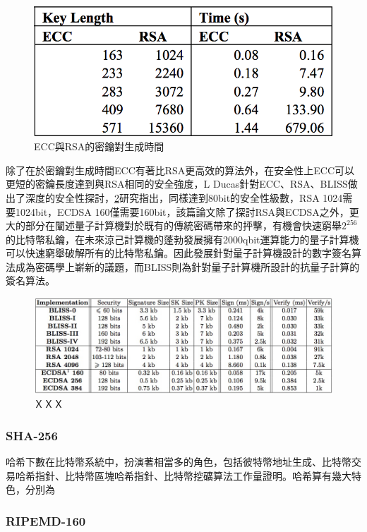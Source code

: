 			\begin{figure}[h]
				\centering
				\includegraphics[width = .5\textwidth]{ECCtime.png}
				\caption{ECC與RSA的密鑰對生成時間\parencite{Performancecomparisonofellipticcurveandrsadigitalsignatures}}\label{ECCtime}
			\end{figure}

			除了在於密鑰對生成時間ECC有著比RSA更高效的算法外，在安全性上ECC可以更短的密鑰長度達到與RSA相同的安全強度，L Ducas針對ECC、RSA、BLISS做出了深度的安全性探討\parencite{LatticesignaturesandbimodalGaussians}，\ref{LatticesignaturesandbimodalGaussians}研究指出，同樣達到80bit的安全性級數，RSA 1024需要1024bit，ECDSA 160僅需要160bit，該篇論文除了探討RSA與ECDSA之外，更大的部分在闡述量子計算機對於既有的傳統密碼帶來的抨擊，有機會快速窮舉$2^{256}$的比特幣私鑰，在未來涼己計算機的蓬勃發展擁有2000qbit運算能力的量子計算機可以快速窮舉破解所有的比特幣私鑰。因此發展針對量子計算機設計的數字簽名算法成為密碼學上嶄新的議題，而BLISS則為針對量子計算機所設計的抗量子計算的簽名算法。

			\begin{figure}[h]
				\centering
				\includegraphics[width = 1\textwidth]{LatticesignaturesandbimodalGaussians.png}
				\caption{ＸＸＸ\parencite{LatticesignaturesandbimodalGaussians}}\label{LatticesignaturesandbimodalGaussians}
			\end{figure}

			\subsubsection{SHA-256}
			哈希下數在比特幣系統中，扮演著相當多的角色，包括彼特幣地址生成、比特幣交易哈希指針、比特幣區塊哈希指針、比特幣挖礦算法工作量證明。哈希算有幾大特色，分別為
			\subsubsection{RIPEMD-160}
